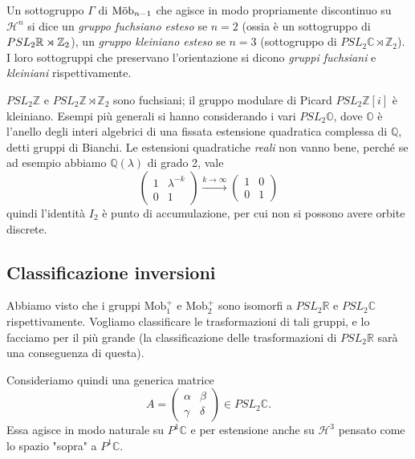 \begin{definizione}
	Un sottogruppo $\Gamma$ di $\operatorname{M\ddot ob}_{n-1}$ che agisce in modo propriamente discontinuo su $\mathcal H^{n}$ si dice un \emph{gruppo fuchsiano esteso} se $n=2$ (ossia è un sottogruppo di $PSL_{2}\mathbb{R}\rtimes\mathbb Z_{2}$), un \emph{gruppo kleiniano esteso} se $n=3$ (sottogruppo di $PSL_{2}\mathbb C\rtimes\mathbb Z_{2}$). I loro sottogruppi che preservano l'orientazione si dicono \emph{gruppi fuchsiani} e \emph{kleiniani} rispettivamente. 
\end{definizione}

\begin{esempio}
	$PSL_{2}\mathbb Z$ e $PSL_{2}\mathbb Z\rtimes\mathbb Z_{2}$ sono fuchsiani; il gruppo modulare di Picard $PSL_{2}\mathbb Z[i]$ è kleiniano. Esempi più generali si hanno considerando i vari $PSL_{2}\mathbb O$, dove $\mathbb O$ è l'anello degli interi algebrici di una fissata estensione quadratica complessa di $\mathbb Q$, detti gruppi di Bianchi.
	Le estensioni quadratiche \emph{reali} non vanno bene, perché se ad esempio abbiamo $\mathbb Q(\lambda)$ di grado 2, vale 
	$$
	\begin{pmatrix}
	1 & \lambda^{-k}\\
	0 & 1
	\end{pmatrix}
	\xrightarrow[]{k\to\infty}
	\begin{pmatrix}
	1 & 0\\
	0 & 1
	\end{pmatrix}$$
	quindi l'identità $I_{2}$ è punto di accumulazione, per cui non si possono avere orbite discrete.
\end{esempio}

\subsection{Classificazione inversioni}

Abbiamo visto che i gruppi $\text{Mob}_1^+$ e $\text{Mob}_2^+$ sono isomorfi a $PSL_2\mathbb R$ e $PSL_2 \mathbb C$ rispettivamente. 
Vogliamo classificare le trasformazioni di tali gruppi, e lo facciamo per il più grande (la classificazione delle trasformazioni di $PSL_2\mathbb R$ sarà una conseguenza di questa).

Consideriamo quindi una generica matrice 
$$A = \begin{pmatrix}\alpha & \beta \\ \gamma & \delta\end{pmatrix}\in PSL_2\mathbb C.$$
Essa agisce in modo naturale su $P^1\mathbb C$ e per estensione anche su $\mathcal H^3$ pensato come lo spazio "sopra" a $P^1\mathbb C$.

